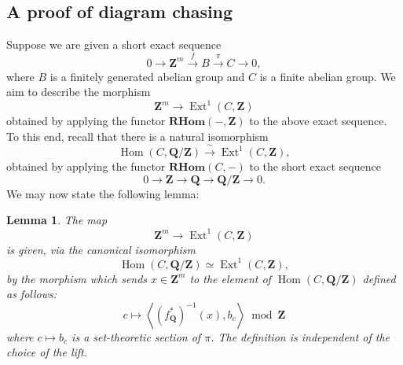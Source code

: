 \documentclass{proc-l}
\newcommand{\Z}{\mathbf{Z}}
\newcommand{\Q}{\mathbf{Q}}
\DeclareMathOperator{\Hom}{Hom}
\DeclareMathOperator{\Ext}{Ext}
\newcommand{\RHom}{\mathbf{R Hom}}
\newtheorem{lemma}[theorem]{Lemma}
\theoremstyle{definition}
\theoremstyle{remark}
\numberwithin{equation}{section}
\begin{document}
\subsection{A proof of diagram chasing}





Suppose we are given a short exact sequence
\begin{equation}\label{equation_appendix_a_lemma_technical}
 0 \longrightarrow \Z^m \xrightarrow{f} B \xrightarrow{\pi} C \longrightarrow 0,
\end{equation}
where $B$ is a finitely generated abelian group and $C$ is a finite abelian group. We aim to describe the morphism
\[
\Z^m \longrightarrow \Ext^1(C,\Z)
\]obtained by applying the functor $\RHom(-,\Z)$ to the above exact sequence. To this end, recall that there is a natural isomorphism
\[
\Hom(C,\Q/\Z) \xrightarrow{\ \sim\ } \Ext^1(C,\Z),
\]
obtained by applying the functor $\RHom(C,-)$ to the short exact sequence
\[
0 \longrightarrow \Z \longrightarrow \Q \longrightarrow \Q/\Z \longrightarrow 0.
\]We may now state the following lemma:

\begin{lemma}\label{lemma_diagramme_chasing_appendix}
The map
\[
\Z^{m} \longrightarrow \Ext^1(C,\Z)
\]
is given, via the canonical isomorphism
\[
\Hom(C,\Q/\Z) \simeq \Ext^1(C,\Z),
\]
by the morphism which sends $x \in \Z^m$ to the element of $\Hom(C,\Q/\Z)$ defined as follows:
\[
c \longmapsto \left\langle (f_{\Q}^*)^{-1} (x), b_c \right\rangle \bmod \Z 
\]where $c \mapsto b_c$ is a set-theoretic section of $\pi$. The definition is independent of the choice of the lift.
\end{lemma}
\end{document}
